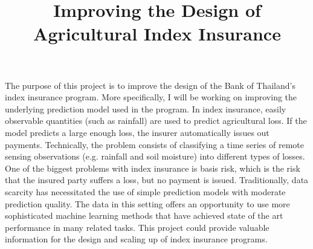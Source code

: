 \documentclass[12pt]{article}
\title{Improving the Design of Agricultural Index Insurance}
\date{}
\begin{document}
\maketitle
\vspace{-5ex}
The purpose of this project is to improve the design of the Bank of Thailand's index insurance program. More specifically, I will be working on improving the underlying prediction model used in the program. In index insurance, easily observable quantities (such as rainfall) are used to predict agricultural loss. If the model predicts a large enough loss, the insurer automatically issues out payments. Technically, the problem consists of classifying a time series of remote sensing observations (e.g. rainfall and soil moisture) into different types of losses. One of the biggest problems with index insurance is basis risk, which is the risk that the insured party suffers a loss, but no payment is issued. Traditionally, data scarcity has necessitated the use of simple prediction models with moderate prediction quality. The data in this setting offers an opportunity to use more sophisticated machine learning methods that have achieved state of the art performance in many related tasks. This project could provide valuable information for the design and scaling up of index insurance programs.




\end{document}
